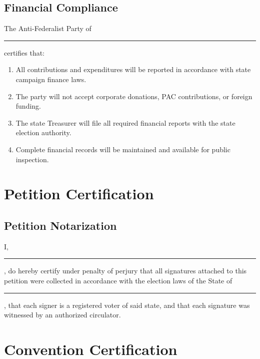 \documentclass[11pt, letterpaper]{article}
\begin{document}

\subsection{Financial Compliance}

The Anti-Federalist Party of \rule{4cm}{0.4pt} certifies that:

\begin{enumerate}
  \item All contributions and expenditures will be reported in accordance with state campaign finance laws.
  \item The party will not accept corporate donations, PAC contributions, or foreign funding.
  \item The state Treasurer will file all required financial reports with the state election authority.
  \item Complete financial records will be maintained and available for public inspection.
\end{enumerate}

\section{Petition Certification}



\subsection{Petition Notarization}

I, \rule{6cm}{0.4pt}, do hereby certify under penalty of perjury that all signatures attached to this petition were collected in accordance with the election laws of the State of \rule{4cm}{0.4pt}, that each signer is a registered voter of said state, and that each signature was witnessed by an authorized circulator.


\section{Convention Certification}
\end{document}
